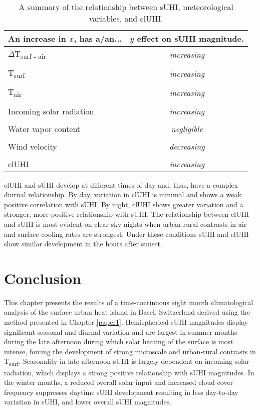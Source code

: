 \begin{bibunit}
\begin{table}[H]
	\centering
	\caption{A summary of the relationship between sUHI, meteorological variables, and clUHI.}
	\label{meteo_cont}
	\begin{tabular}{lc}
		\toprule 
		An increase in $x$, has a/an... & $y$ effect on sUHI magnitude. \\
		\midrule
		$\Delta$T\textsubscript{surf - air} &\textit{increasing} \\
		&\\
		T\textsubscript{surf} & \textit{increasing} \\
		&\\
		T\textsubscript{air} & \textit{increasing} \\
		&\\
		Incoming solar radiation & \textit{increasing}  \\
		& \\
		Water vapor content & \textit{negligible} \\
		&\\
		Wind velocity &\textit{decreasing} \\
		&\\
		clUHI &\textit{increasing} \\
		\bottomrule
	\end{tabular} 
\end{table}

clUHI and sUHI develop at different times of day and, thus, have a complex diurnal relationship. By day, variation in clUHI is minimal and shows a weak positive correlation with sUHI. By night, clUHI shows greater variation and a stronger, more positive relationship with sUHI. The relationship between clUHI and sUHI is most evident on clear sky nights when urban-rural contrasts in air and surface cooling rates are strongest. Under these conditions sUHI and clUHI  show similar development in the hours after sunset.

\section{Conclusion}

This chapter presents the results of a time-continuous eight month climatological analysis of the surface urban heat island in Basel, Switzerland derived using the method presented in Chapter \ref{paper1}. Hemispherical sUHI magnitudes display significant seasonal and diurnal variation and are largest in summer months during the late afternoon during which solar heating of the surface is most intense, forcing the development of strong microscale and urban-rural contrasts in T\textsubscript{surf}. Seasonality in late afternoon sUHI is largely dependent on incoming solar radiation, which displays a strong positive relationship with sUHI magnitudes. In the winter months, a reduced overall solar input and increased cloud cover frequency suppresses daytime sUHI development resulting in less day-to-day variation in sUHI, and lower overall sUHI magnitudes. 


\end{bibunit}
